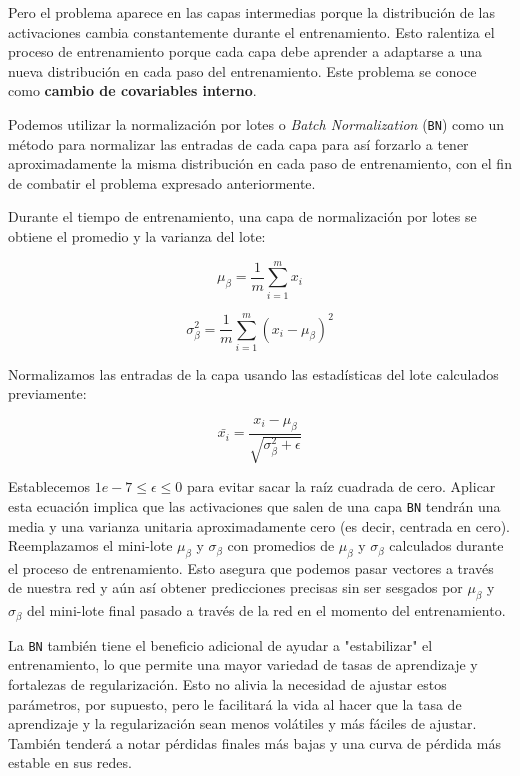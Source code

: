 \documentclass[a4paper,12pt]{article}
\begin{document}
Pero el problema aparece en las capas intermedias porque la distribución de las activaciones cambia constantemente durante el entrenamiento. Esto ralentiza el proceso de entrenamiento porque cada capa debe aprender a adaptarse a una nueva distribución en cada paso del entrenamiento. Este problema se conoce como \textbf{cambio de covariables interno}.

Podemos utilizar la normalización por lotes o \textit{Batch Normalization} (\texttt{BN}) como un método para normalizar las entradas de cada capa para así forzarlo a tener aproximadamente la misma distribución en cada paso de entrenamiento, con el fin de combatir el problema expresado anteriormente.

Durante el tiempo de entrenamiento, una capa de normalización por lotes se obtiene el promedio y la varianza del lote:

$$ \mu_{\beta} = \frac{1}{m} \sum_{i=1}^m x_i $$

$$ \sigma_{\beta}^2 = \frac{1}{m}  \sum_{i=1}^m (x_i - \mu_{\beta} ) ^2$$

Normalizamos las entradas de la capa usando las estadísticas del lote calculados previamente:

$$ \bar{x_i} = \frac{x_i - \mu_{\beta}}{\sqrt{\sigma_{\beta}^2+\epsilon}} $$



Establecemos $1e-7 \leq \epsilon \leq 0$ para evitar sacar la raíz cuadrada de cero. Aplicar esta ecuación implica que las activaciones que salen de una capa \texttt{BN} tendrán una media y una varianza unitaria aproximadamente cero (es decir, centrada en cero).
Reemplazamos el mini-lote $\mu_{\beta}$ y $\sigma_{\beta}$ con promedios de $\mu_{\beta}$ y $\sigma_{\beta}$ calculados durante el proceso de entrenamiento. Esto asegura que podemos pasar vectores a través de nuestra red y aún así obtener predicciones precisas sin ser sesgados por $\mu_{\beta}$ y $\sigma_{\beta}$ del mini-lote final pasado a través de la red en el momento del entrenamiento. 

La \texttt{BN} también tiene el beneficio adicional de ayudar a "estabilizar" el entrenamiento, lo que permite una mayor variedad de tasas de aprendizaje y fortalezas de regularización. Esto no alivia la necesidad de ajustar estos parámetros, por supuesto, pero le facilitará la vida al hacer que la tasa de aprendizaje y la regularización sean menos volátiles y más fáciles de ajustar. También tenderá a notar pérdidas finales más bajas y una curva de pérdida más estable en sus redes.
\end{document}

